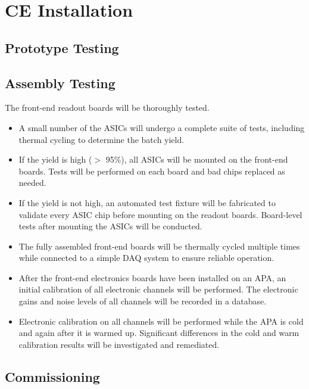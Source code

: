 %
\section{CE Installation}
\label{sec:ce-install}

\subsection{Prototype Testing}
\label{sec:ce-install-proto}

\subsection{Assembly Testing}
\label{sec:ce-install-assembly}

The front-end readout boards will be thoroughly tested.
\begin{itemize}
\item A small number of the ASICs will undergo a complete suite 
of tests, including thermal cycling to determine the batch yield.
\item If the yield is high ($>$ 95\%), all ASICs will be mounted 
on the front-end boards.
Tests will be performed on each board and bad chips replaced as needed.
\item If the yield is not high, an automated test fixture will be 
fabricated to validate every ASIC chip before mounting on the readout boards.
Board-level tests after mounting the ASICs will be conducted.
\item The fully assembled front-end boards will be thermally cycled multiple times while connected
to a simple DAQ system to ensure reliable operation.
\item After the front-end electronics boards have been installed on an APA,
an initial calibration of all electronic channels will be performed.
The electronic gains and noise levels of all channels will be recorded in a database.
\item Electronic calibration on all channels will be performed while the APA is cold and again after it is warmed up.
Significant differences in the cold and warm calibration results will be investigated and remediated.  
\end{itemize}

%
\subsection{Commissioning } 
\label{sec:ce-install-commission}

